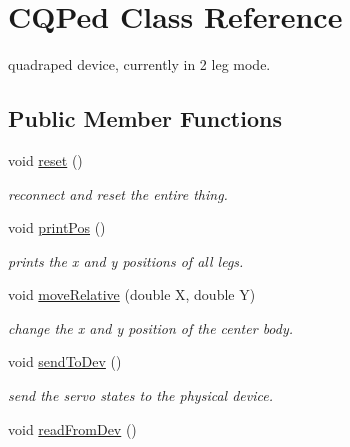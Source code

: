 \hypertarget{class_c_q_ped}{
\section{CQPed Class Reference}
\label{class_c_q_ped}
}


quadraped device, currently in 2 leg mode.  


\subsection*{Public Member Functions}
\begin{DoxyCompactItemize}
\item 
void \hyperlink{class_c_q_ped_a93038e7ebe45982833d8250dfc64fc11}{reset} ()
\begin{DoxyCompactList}\small\item\em reconnect and reset the entire thing. \item\end{DoxyCompactList}\item 
\hypertarget{class_c_q_ped_af3a3e9af02572add33090c02648da08a}{
void \hyperlink{class_c_q_ped_af3a3e9af02572add33090c02648da08a}{printPos} ()}
\label{class_c_q_ped_af3a3e9af02572add33090c02648da08a}

\begin{DoxyCompactList}\small\item\em prints the x and y positions of all legs. \item\end{DoxyCompactList}\item 
\hypertarget{class_c_q_ped_adfdd083aee142c9c27f7aeb7c5bae0aa}{
void \hyperlink{class_c_q_ped_adfdd083aee142c9c27f7aeb7c5bae0aa}{moveRelative} (double X, double Y)}
\label{class_c_q_ped_adfdd083aee142c9c27f7aeb7c5bae0aa}

\begin{DoxyCompactList}\small\item\em change the x and y position of the center body. \item\end{DoxyCompactList}\item 
\hypertarget{class_c_q_ped_acb8649785d6f4ec1c6f15735a9e8977f}{
void \hyperlink{class_c_q_ped_acb8649785d6f4ec1c6f15735a9e8977f}{sendToDev} ()}
\label{class_c_q_ped_acb8649785d6f4ec1c6f15735a9e8977f}

\begin{DoxyCompactList}\small\item\em send the servo states to the physical device. \item\end{DoxyCompactList}\item 
\hypertarget{class_c_q_ped_aac05763481aaef8e97cb1491bfca4334}{
void \hyperlink{class_c_q_ped_aac05763481aaef8e97cb1491bfca4334}{readFromDev} ()}
\label{class_c_q_ped_aac05763481aaef8e97cb1491bfca4334}


\end{DoxyCompactItemize}
